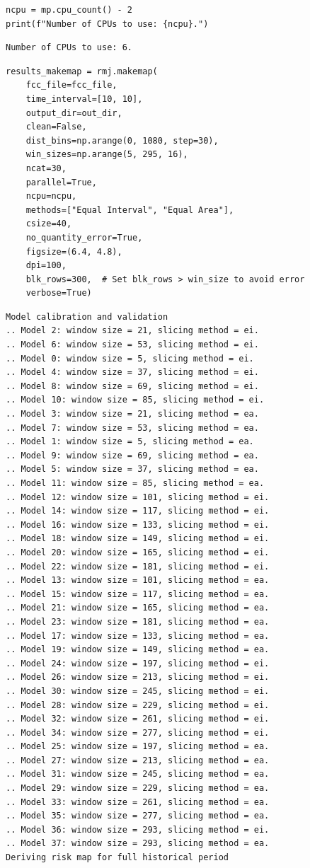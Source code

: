 \documentclass[paper=a4, 12pt, DIV=12]{scrartcl}
\begin{document}
\begin{verbatim}
ncpu = mp.cpu_count() - 2
print(f"Number of CPUs to use: {ncpu}.") 
\end{verbatim}

\begin{verbatim}
Number of CPUs to use: 6.
\end{verbatim}


\begin{verbatim}
results_makemap = rmj.makemap(
    fcc_file=fcc_file,
    time_interval=[10, 10],
    output_dir=out_dir,
    clean=False,
    dist_bins=np.arange(0, 1080, step=30),
    win_sizes=np.arange(5, 295, 16),
    ncat=30,
    parallel=True,
    ncpu=ncpu,
    methods=["Equal Interval", "Equal Area"],
    csize=40,
    no_quantity_error=True,
    figsize=(6.4, 4.8),
    dpi=100,
    blk_rows=300,  # Set blk_rows > win_size to avoid error
    verbose=True)
\end{verbatim}

\begin{verbatim}
Model calibration and validation
.. Model 2: window size = 21, slicing method = ei.
.. Model 6: window size = 53, slicing method = ei.
.. Model 0: window size = 5, slicing method = ei.
.. Model 4: window size = 37, slicing method = ei.
.. Model 8: window size = 69, slicing method = ei.
.. Model 10: window size = 85, slicing method = ei.
.. Model 3: window size = 21, slicing method = ea.
.. Model 7: window size = 53, slicing method = ea.
.. Model 1: window size = 5, slicing method = ea.
.. Model 9: window size = 69, slicing method = ea.
.. Model 5: window size = 37, slicing method = ea.
.. Model 11: window size = 85, slicing method = ea.
.. Model 12: window size = 101, slicing method = ei.
.. Model 14: window size = 117, slicing method = ei.
.. Model 16: window size = 133, slicing method = ei.
.. Model 18: window size = 149, slicing method = ei.
.. Model 20: window size = 165, slicing method = ei.
.. Model 22: window size = 181, slicing method = ei.
.. Model 13: window size = 101, slicing method = ea.
.. Model 15: window size = 117, slicing method = ea.
.. Model 21: window size = 165, slicing method = ea.
.. Model 23: window size = 181, slicing method = ea.
.. Model 17: window size = 133, slicing method = ea.
.. Model 19: window size = 149, slicing method = ea.
.. Model 24: window size = 197, slicing method = ei.
.. Model 26: window size = 213, slicing method = ei.
.. Model 30: window size = 245, slicing method = ei.
.. Model 28: window size = 229, slicing method = ei.
.. Model 32: window size = 261, slicing method = ei.
.. Model 34: window size = 277, slicing method = ei.
.. Model 25: window size = 197, slicing method = ea.
.. Model 27: window size = 213, slicing method = ea.
.. Model 31: window size = 245, slicing method = ea.
.. Model 29: window size = 229, slicing method = ea.
.. Model 33: window size = 261, slicing method = ea.
.. Model 35: window size = 277, slicing method = ea.
.. Model 36: window size = 293, slicing method = ei.
.. Model 37: window size = 293, slicing method = ea.
Deriving risk map for full historical period
\end{verbatim}
\end{document}
